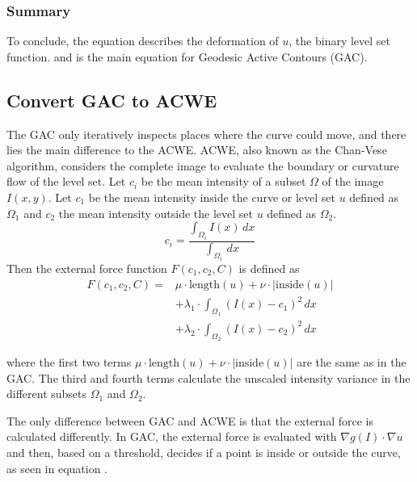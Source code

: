 \subsubsection{Summary}
To conclude, the equation  describes the deformation of $u$, the binary level set function. and is the main equation for Geodesic Active Contours (GAC). 

\subsection{Convert GAC to ACWE}
\label{sus:GACtoACWE}
The GAC only iteratively inspects places where the curve could move, and there lies the main difference to the ACWE. ACWE, also known as the Chan-Vese algorithm, considers the complete image to evaluate the boundary or curvature flow of the level set. 
Let $c_i$ be the mean intensity of a subset $\Omega$ of the image $I(x,y)$. Let $c_1$ be the mean intensity inside the curve or level set $u$ defined as $\Omega_1$ and $c_2$ the mean intensity outside the level set $u$ defined as $\Omega_2$. 
\begin{equation}
    c_{i}= \frac{ \int_{\Omega_{i}} I(x) \,dx}{\int_{\Omega_{i}} \, dx }
    \label{eq:meanintensity}
\end{equation}
Then the external force function $F(c_1,c_2,C)$ is defined as
\begin{equation}
    \begin{split}
    F(c_1, c_2, C) = & \mu \cdot \text{length}(u) + \nu \cdot |\text{inside}(u)| \\
    & + \lambda_1 \cdot \int_{\Omega_1} (I(x) - c_1)^2 \, dx \\
    & + \lambda_2 \cdot \int_{\Omega_2} (I(x) - c_2)^2 \, dx
    \end{split}
    \label{eq:curvatureflow}
    \end{equation}

where the first two terms $\mu \cdot \text{length}(u) + \nu \cdot |\text{inside}(u)|$ are the same as in the GAC. The third and fourth terms calculate the unscaled intensity variance in the different subsets $\Omega_1$ and $\Omega_2$. 

The only difference between GAC and ACWE is that the external force is calculated differently. In GAC, the external force is evaluated with $\nabla g(I) \cdot \nabla u$ and then, based on a threshold, decides if a point is inside or outside the curve, as seen in equation . 

